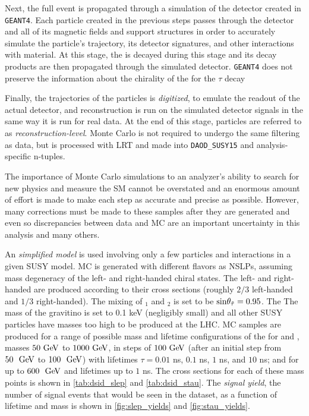 Next, the full event is propagated through a simulation of the detector created in \texttt{GEANT4}. Each particle created in the previous steps passes through the detector and all of its magnetic fields and support structures in order to accurately simulate the particle's trajectory, its detector signatures, and other interactions with material. At this stage, the \slep is decayed during this stage and its decay products are then propagated through the simulated detector. \texttt{GEANT4} does not preserve the information about the chirality of the \stau for the $\tau$ decay

Finally, the trajectories of the particles is \emph{digitized}, to emulate the readout of the actual detector, and reconstruction is run on the simulated detector signals in the same way it is run for real data. At the end of this stage, particles are referred to as \emph{reconstruction-level}. Monte Carlo is not required to undergo the same filtering as data, but is processed with \ac{LRT} and made into \texttt{DAOD\_SUSY15} and analysis-specific n-tuples.  

The importance of Monte Carlo simulations to an analyzer's ability to search for new physics and measure the \ac{SM} cannot be overstated and an enormous amount of effort is made to make each step as accurate and precise as possible. However, many corrections must be made to these samples after they are generated and even so discrepancies between data and \ac{MC} are an important uncertainty in this analysis and many others.

An \emph{simplified model} is used involving only a few particles and interactions in a given \ac{SUSY} model. \ac{MC} is generated with different \slep flavors as \acp{NSLP}, assuming mass degeneracy of the left- and right-handed chiral states. The left- and right-handed \slep are produced according to their cross sections (roughly $2/3$ left-handed and $1/3$ right-handed). The mixing of \stau$_{1}$ and \stau$_{2}$ is set to be $\mathrm{sin} \theta_{\tilde{\tau}} = 0.95$. The The mass of the gravitino is set to 0.1 keV (negligibly small) and all other \ac{SUSY} particles have masses too high to be produced at the \ac{LHC}. \ac{MC} samples are produced for a range of possible mass and lifetime configurations of the \slep for \selec and \smu, masses $50 \GeV$ to $1000 \GeV$, in steps of $100 \GeV$ (after an initial step from $50~\GeV$ to $100~\GeV$) with lifetimes $\tau = 0.01$ ns, $0.1$ ns, $1$ ns, and $10$ ns; and for \stau up to $600~\GeV$ and lifetimes up to $1$ ns.  The cross sections for each of these mass points is shown in \autoref{tab:dsid_slep} and \autoref{tab:dsid_stau}. The \emph{signal yield}, the number of signal events that would be seen in the dataset, as a function of \slep lifetime and mass is shown in \autoref{fig:slep_yields} and \autoref{fig:stau_yields}.

